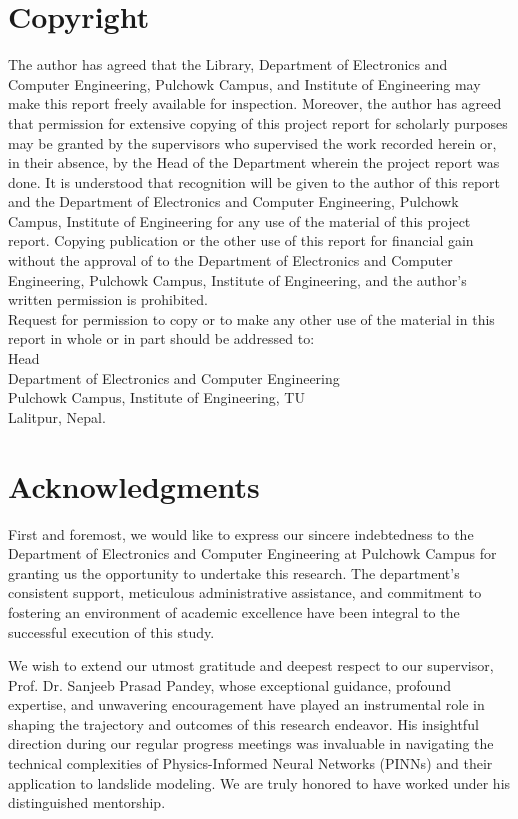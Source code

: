 \documentclass[12pt]{report}
\begin{document}
\chapter*{Copyright}
The author has agreed that the Library, Department of Electronics and Computer Engineering, Pulchowk Campus, and Institute of Engineering may make this report freely available for inspection. Moreover, the author has agreed that permission for extensive copying of this project report for scholarly purposes may be granted by the supervisors who supervised the work recorded herein or, in their absence, by the Head of the Department wherein the project report was done. It is understood that recognition will be given to the author of this report and the Department of Electronics and Computer Engineering, Pulchowk Campus, Institute of Engineering for any use of the material of this project report. Copying publication or the other use of this report for financial gain without the approval of to the Department of Electronics and Computer Engineering, Pulchowk Campus, Institute of Engineering, and the author's written permission is prohibited.\\
Request for permission to copy or to make any other use of the material in this report in whole or in part should be addressed to:\\
\newline
\newline
\newline
Head\\
Department of Electronics and Computer Engineering\\
Pulchowk Campus, Institute of Engineering, TU\\
Lalitpur, Nepal.
\chapter*{Acknowledgments}
First and foremost, we would like to express our sincere indebtedness to the Department of Electronics and Computer Engineering at Pulchowk Campus for granting us the opportunity to undertake this research. The department's consistent support, meticulous administrative assistance, and commitment to fostering an environment of academic excellence have been integral to the successful execution of this study.

We wish to extend our utmost gratitude and deepest respect to our supervisor, Prof. Dr. Sanjeeb Prasad Pandey, whose exceptional guidance, profound expertise, and unwavering encouragement have played an instrumental role in shaping the trajectory and outcomes of this research endeavor. His insightful direction during our regular progress meetings was invaluable in navigating the technical complexities of Physics-Informed Neural Networks (PINNs) and their application to landslide modeling. We are truly honored to have worked under his distinguished mentorship.
\end{document}
